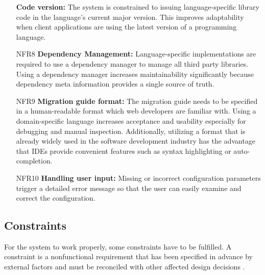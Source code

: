 \begin{itemize}[itemindent=-13pt, leftmargin=43pt, align=left]
    \textbf{Code version:} The system is constrained to issuing language-specific library code in the language's current major version. This improves adaptability when client applications are using the latest version of a programming language.
    \item [NFR8\hphantom{1}] 
    \textbf{Dependency Management:} Language-specific implementations are required to use a dependency manager to manage all third party libraries. Using a dependency manager increases maintainability significantly because dependency meta information provides a single source of truth.
        \item [NFR9\hphantom{1}] 
    \textbf{Migration guide format:} The migration guide needs to be specified in a human-readable format which web developers are familiar with. Using a domain-specific language increases acceptance and usability especially for debugging and manual inspection. Additionally, utilizing a format that is already widely used in the software development industry has the advantage that IDEs provide convenient features such as syntax highlighting or auto-completion.
        \item [NFR10\hphantom{1}] 
    \textbf{Handling user input:} Missing or incorrect configuration parameters trigger a detailed error message so that the user can easily examine and correct the configuration.
\end{itemize}

\subsection{Constraints}
\label{subsec:Constraints}

For the system to work properly, some constraints have to be fulfilled. A constraint is a nonfunctional requirement that has been specified in advance by external factors and must be reconciled with other affected design decisions \cite{bass_software_2013}.

